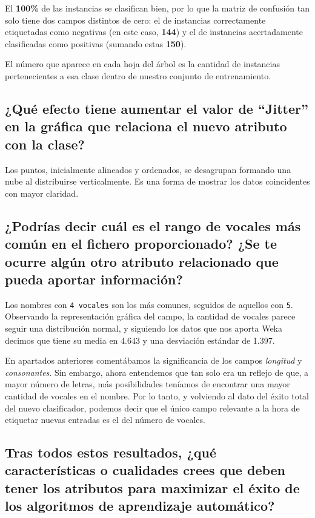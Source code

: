 \documentclass[12pt]{article}
\begin{document}
El \textbf{100\%} de las instancias se clasifican bien, por lo que la matriz de confusión tan solo tiene dos campos distintos de cero: el de instancias correctamente etiquetadas como negativas (en este caso, \textbf{144}) y el de instancias acertadamente clasificadas como positivas (sumando estas \textbf{150}).

El número que aparece en cada hoja del árbol es la cantidad de instancias pertenecientes a esa clase dentro de nuestro conjunto de entrenamiento.

\subsection*{\small ¿Qué efecto tiene aumentar el valor de ``Jitter'' en la gráfica que relaciona el nuevo atributo con la clase?}

Los puntos, inicialmente alineados y ordenados, se desagrupan formando una nube al distribuirse verticalmente. Es una forma de mostrar los datos coincidentes con mayor claridad.

\subsection*{\small ¿Podrías decir cuál es el rango de vocales más común en el fichero proporcionado? ¿Se te ocurre algún otro atributo relacionado que pueda aportar información?}

Los nombres con \texttt{4 vocales} son los más comunes, seguidos de aquellos con \texttt{5}. Observando la representación gráfica del campo, la cantidad de vocales parece seguir una distribución normal, y siguiendo los datos que nos aporta Weka decimos que tiene su media en 4.643 y una desviación estándar de 1.397.

En apartados anteriores comentábamos la significancia de los campos \emph{longitud} y \emph{consonantes}. Sin embargo, ahora entendemos que tan solo era un reflejo de que, a mayor número de letras, más posibilidades teníamos de encontrar una mayor cantidad de vocales en el nombre. Por lo tanto, y volviendo al dato del éxito total del nuevo clasificador, podemos decir que el único campo relevante a la hora de etiquetar nuevas entradas es el del número de vocales.

\subsection*{\small Tras todos estos resultados, ¿qué características o cualidades crees que deben tener los atributos para maximizar el éxito de los algoritmos de aprendizaje automático?}
\end{document}
